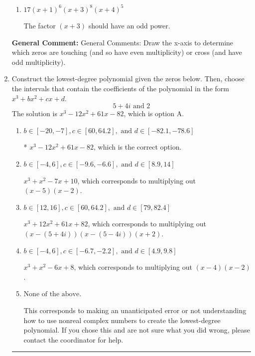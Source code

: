 \documentclass{extbook}[14pt]
\newcommand{\litem}[1]{\item #1

\rule{\textwidth}{0.4pt}}
\begin{document}
\begin{enumerate}
{\begin{enumerate}[label=\Alph*.]
The factor $(x + 4)$ should have an odd power and the leading coefficient should be the opposite sign.
\item \( 17(x + 1)^{6} (x + 3)^{8} (x + 4)^{5} \)

The factor $(x + 3)$ should have an odd power.
\end{enumerate}

\textbf{General Comment:} General Comments: Draw the x-axis to determine which zeros are touching (and so have even multiplicity) or cross (and have odd multiplicity).
}
\litem{
Construct the lowest-degree polynomial given the zeros below. Then, choose the intervals that contain the coefficients of the polynomial in the form $x^3+bx^2+cx+d$.
\[ 5 + 4 i \text{ and } 2 \]The solution is \( x^{3} -12 x^{2} +61 x -82 \), which is option A.\begin{enumerate}[label=\Alph*.]
\item \( b \in [-20, -7], c \in [60, 64.2], \text{ and } d \in [-82.1, -78.6] \)

* $x^{3} -12 x^{2} +61 x -82$, which is the correct option.
\item \( b \in [-4, 6], c \in [-9.6, -6.6], \text{ and } d \in [8.9, 14] \)

$x^{3} + x^{2} -7 x + 10$, which corresponds to multiplying out $(x -5)(x -2)$.
\item \( b \in [12, 16], c \in [60, 64.2], \text{ and } d \in [79, 82.4] \)

$x^{3} +12 x^{2} +61 x + 82$, which corresponds to multiplying out $(x-(5 + 4 i))(x-(5 - 4 i))(x + 2)$.
\item \( b \in [-4, 6], c \in [-6.7, -2.2], \text{ and } d \in [4.9, 9.8] \)

$x^{3} + x^{2} -6 x + 8$, which corresponds to multiplying out $(x -4)(x -2)$.
\item \( \text{None of the above.} \)

This corresponds to making an unanticipated error or not understanding how to use nonreal complex numbers to create the lowest-degree polynomial. If you chose this and are not sure what you did wrong, please contact the coordinator for help.
\end{enumerate}

}
\end{enumerate}
\end{document}
